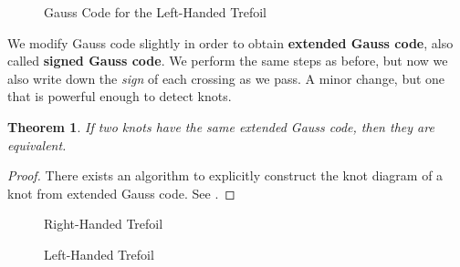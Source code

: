 \documentclass{article}
\theoremstyle{plain}
\newtheorem{theorem}{Theorem}
\begin{document}
        \begin{figure}
            \centering
            \caption{Gauss Code for the Left-Handed Trefoil}
            \label{fig:left_handed_trefoil_gauss_code}
        \end{figure}
        \par\hfill\par
        We modify Gauss code slightly in order to obtain
        \textbf{extended Gauss code}, also called \textbf{signed Gauss code}.
        We perform the same steps as before, but now we also write down the
        \textit{sign} of each crossing as we pass. A minor change, but one
        that is powerful enough to detect knots.
        \begin{theorem}
            If two knots have the same extended Gauss code, then they are
            equivalent.
        \end{theorem}
        \begin{proof}
            There exists an algorithm to explicitly construct the knot diagram
            of a knot from extended Gauss code. See
            \cite{KauffmanVirtualKnots1999}.
        \end{proof}
        \begin{figure}
            \centering
            \begin{minipage}[b]{0.49\textwidth}
                \centering
                \caption[Right-Handed Trefoil Extended Gauss Code]
                {Right-Handed Trefoil}
                \label{fig:trefoil_knot_oriented_with_extended_gauss_code}
            \end{minipage}
            \hfill
            \begin{minipage}[b]{0.49\textwidth}
                \centering
            \caption[Left-Handed Trefoil Extended Gauss Code]
            {Left-Handed Trefoil}
            \label{fig:trefoil_knot_mirror_oriented_with_extended_gauss_code}
            \end{minipage}
        \end{figure}
\end{document}
